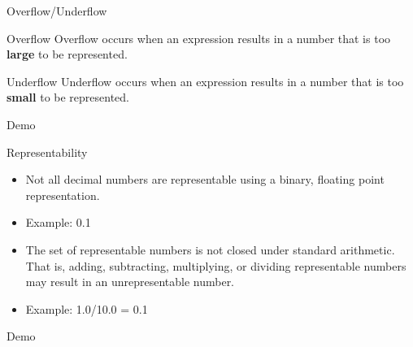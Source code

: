\documentclass[serif,xcolor=pdftex,dvipsnames,table,hyperref={bookmarks=false,breaklinks}]{beamer}
\begin{document}

\begin{frame}[t]{Overflow/Underflow}
	\pause
	\begin{block}{Overflow}
		Overflow occurs when an expression results in a number that is too \textbf{large} to be represented.
	\end{block}
	
	\pause
	\begin{block}{Underflow}
		Underflow occurs when an expression results in a number that is too \textbf{small} to be represented.
	\end{block}
	
	\pause
	\centering
	\Huge{Demo}
	
\end{frame}

\begin{frame}[t]{Representability}
	\begin{itemize}[<+->]
		\item Not all decimal numbers are representable using a binary, floating point representation.
		\item Example: 0.1
		\item The set of representable numbers is not closed under standard arithmetic. That is, adding, subtracting, multiplying, or dividing representable numbers may result in an unrepresentable number.
		\item Example: 1.0/10.0 = 0.1
	\end{itemize}
	
	\pause
	\centering
	\Huge{Demo}
\end{frame}
\end{document}

